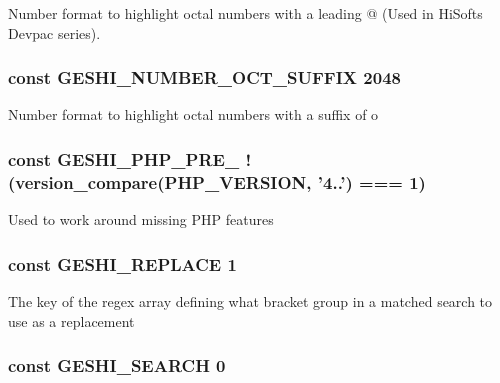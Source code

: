 Number format to highlight octal numbers with a leading @ (Used in Hi\-Softs Devpac series). \hypertarget{geshi_8php_a6ae313a6370f813f1dbe9b6e969285e2}{
\subsubsection[{G\-E\-S\-H\-I\-\_\-\-N\-U\-M\-B\-E\-R\-\_\-\-O\-C\-T\-\_\-\-S\-U\-F\-F\-I\-X}]{\setlength{\rightskip}{0pt plus 5cm}const G\-E\-S\-H\-I\-\_\-\-N\-U\-M\-B\-E\-R\-\_\-\-O\-C\-T\-\_\-\-S\-U\-F\-F\-I\-X 2048}}\label{geshi_8php_a6ae313a6370f813f1dbe9b6e969285e2}
Number format to highlight octal numbers with a suffix of o \hypertarget{geshi_8php_abb000b37c91b5b05b426aecabddbe3a5}{
\subsubsection[{G\-E\-S\-H\-I\-\_\-\-P\-H\-P\-\_\-\-P\-R\-E\-\_\-433}]{\setlength{\rightskip}{0pt plus 5cm}const G\-E\-S\-H\-I\-\_\-\-P\-H\-P\-\_\-\-P\-R\-E\-\_ !(version\-\_\-compare(P\-H\-P\-\_\-\-V\-E\-R\-S\-I\-O\-N, '4..') === 1)}}\label{geshi_8php_abb000b37c91b5b05b426aecabddbe3a5}
Used to work around missing P\-H\-P features \hypertarget{geshi_8php_accd34e52b0bbc2beff3cf62e33d24f6c}{
\subsubsection[{G\-E\-S\-H\-I\-\_\-\-R\-E\-P\-L\-A\-C\-E}]{\setlength{\rightskip}{0pt plus 5cm}const G\-E\-S\-H\-I\-\_\-\-R\-E\-P\-L\-A\-C\-E 1}}\label{geshi_8php_accd34e52b0bbc2beff3cf62e33d24f6c}
The key of the regex array defining what bracket group in a matched search to use as a replacement \hypertarget{geshi_8php_a600cf0cefcaff88611c607804fa92d9b}{
\subsubsection[{G\-E\-S\-H\-I\-\_\-\-S\-E\-A\-R\-C\-H}]{\setlength{\rightskip}{0pt plus 5cm}const G\-E\-S\-H\-I\-\_\-\-S\-E\-A\-R\-C\-H 0}}\label{geshi_8php_a600cf0cefcaff88611c607804fa92d9b}
